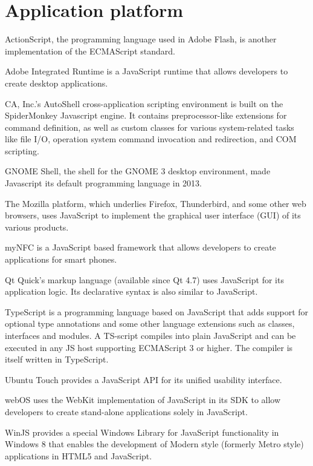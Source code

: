 \section{Application platform}


\begin{compactitem}
\item ActionScript, the programming language used in Adobe Flash, is another implementation of the ECMAScript standard.
\item Adobe Integrated Runtime is a JavaScript runtime that allows developers to create desktop applications.
\item CA, Inc.'s AutoShell cross-application scripting environment is built on the SpiderMonkey Javascript engine. It contains preprocessor-like extensions for command definition, as well as custom classes for various system-related tasks like file I/O, operation system command invocation and redirection, and COM scripting.
\item GNOME Shell, the shell for the GNOME 3 desktop environment, made Javascript its default programming language in 2013.
\item The Mozilla platform, which underlies Firefox, Thunderbird, and some other web browsers, uses JavaScript to implement the graphical user interface (GUI) of its various products.
\item myNFC is a JavaScript based framework that allows developers to create applications for smart phones.
\item Qt Quick's markup language (available since Qt 4.7) uses JavaScript for its application logic. Its declarative syntax is also similar to JavaScript.
\item TypeScript is a programming language based on JavaScript that adds support for optional type annotations and some other language extensions such as classes, interfaces and modules. A TS-script compiles into plain JavaScript and can be executed in any JS host supporting ECMAScript 3 or higher. The compiler is itself written in TypeScript.
\item Ubuntu Touch provides a JavaScript API for its unified usability interface.
\item webOS uses the WebKit implementation of JavaScript in its SDK to allow developers to create stand-alone applications solely in JavaScript.
\item WinJS provides a special Windows Library for JavaScript functionality in Windows 8 that enables the development of Modern style (formerly Metro style) applications in HTML5 and JavaScript.
\end{compactitem}












